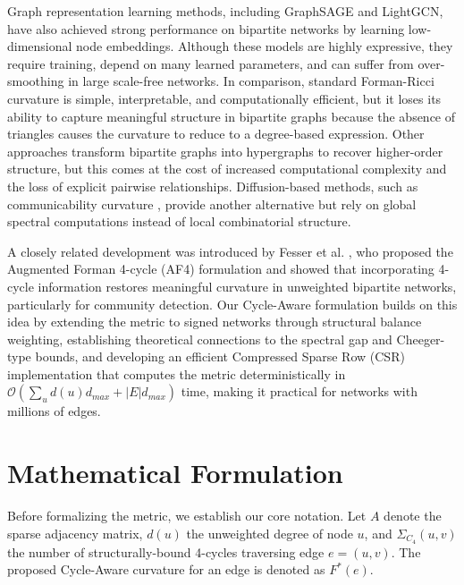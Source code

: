 \documentclass{siuro250211}
\theoremstyle{remark}
\theoremstyle{plain}
\begin{document}
Graph representation learning methods, including GraphSAGE and LightGCN, have also achieved strong performance on bipartite networks by learning low-dimensional node embeddings. Although these models are highly expressive, they require training, depend on many learned parameters, and can suffer from over-smoothing in large scale-free networks. In comparison, standard Forman-Ricci curvature is simple, interpretable, and computationally efficient, but it loses its ability to capture meaningful structure in bipartite graphs because the absence of triangles causes the curvature to reduce to a degree-based expression. Other approaches transform bipartite graphs into hypergraphs to recover higher-order structure, but this comes at the cost of increased computational complexity and the loss of explicit pairwise relationships. Diffusion-based methods, such as communicability curvature \cite{estrada2012communicability}, provide another alternative but rely on global spectral computations instead of local combinatorial structure.

A closely related development was introduced by Fesser et al. \cite{fesser2024augmentations}, who proposed the Augmented Forman 4-cycle (AF4) formulation and showed that incorporating 4-cycle information restores meaningful curvature in unweighted bipartite networks, particularly for community detection. Our Cycle-Aware formulation builds on this idea by extending the metric to signed networks through structural balance weighting, establishing theoretical connections to the spectral gap and Cheeger-type bounds, and developing an efficient Compressed Sparse Row (CSR) implementation that computes the metric deterministically in $\mathcal{O}(\sum_u d(u) d_{max} + |E|d_{max})$ time, making it practical for networks with millions of edges.


\section{Mathematical Formulation} 

Before formalizing the metric, we establish our core notation. Let $A$ denote the sparse adjacency matrix, $d(u)$ the unweighted degree of node $u$, and $\Sigma_{C_4}(u, v)$ the number of structurally-bound 4-cycles traversing edge $e=(u,v)$. The proposed Cycle-Aware curvature for an edge is denoted as $F^*(e)$.
\end{document}
